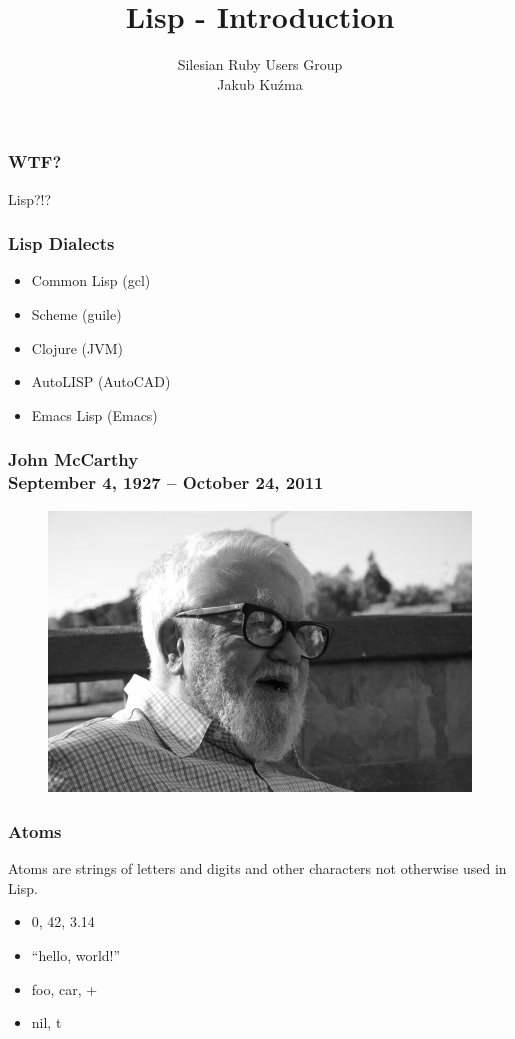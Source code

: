 \documentclass[16pt]{beamer}
\author{Silesian Ruby Users Group\\\footnotesize{Jakub Kuźma}}
\title{Lisp - Introduction}
\begin{document}
\frame{\titlepage}

\begin{frame}
  \frametitle{WTF?}
  \begin{center}
    Lisp?!?
  \end{center}
\end{frame}

\begin{frame}
  \frametitle{Lisp Dialects}
  \begin{itemize}
  \item Common Lisp (gcl)
  \item Scheme (guile)
  \item Clojure (JVM)
  \item AutoLISP (AutoCAD)
  \item Emacs Lisp (Emacs)
  \end{itemize}
\end{frame}

\begin{frame}
  \frametitle{John McCarthy\\September 4, 1927 -- October 24, 2011}
  \begin{figure}
    \includegraphics[width=0.8\linewidth]{mccarthy.jpg}
  \end{figure}
\end{frame}

\begin{frame}
  \frametitle{Atoms}
  \begin{block}{}
    Atoms are strings of letters and digits and other characters not
    otherwise used in Lisp.
  \end{block}
  \begin{itemize}
  \item 0, 42, 3.14
  \item ``hello, world!''
  \item foo, car, +
  \item nil, t
  \end{itemize}
\end{frame}
\end{document}
